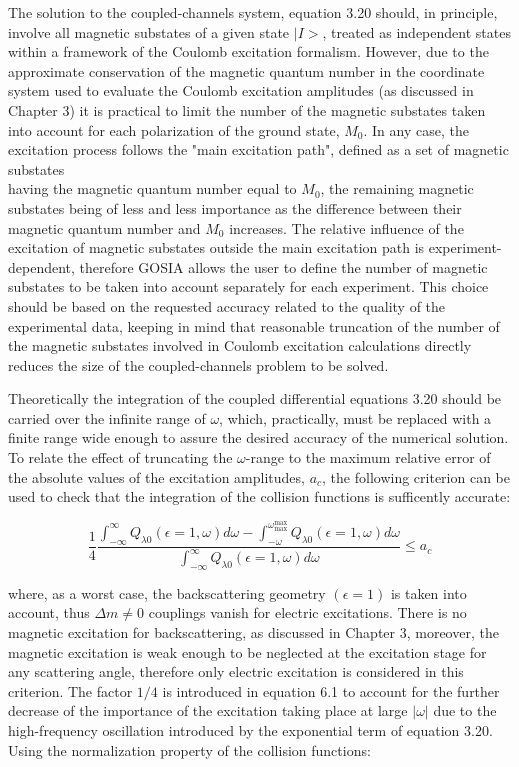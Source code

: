 \documentclass[10pt]{article}
\begin{document}
The solution to the coupled-channels system, equation 3.20 should, in principle, involve all magnetic substates of a given state $\mid I>$, treated as independent states within a framework of the Coulomb excitation formalism. However, due to the approximate conservation of the magnetic quantum number in the coordinate system used to evaluate the Coulomb excitation amplitudes (as discussed in Chapter 3) it is practical to limit the number of the magnetic substates taken into account for each polarization of the ground state, $M_{0}$. In any case, the excitation process follows the "main excitation path", defined as a set of magnetic substates\\
having the magnetic quantum number equal to $M_{0}$, the remaining magnetic substates being of less and less importance as the difference between their magnetic quantum number and $M_{0}$ increases. The relative influence of the excitation of magnetic substates outside the main excitation path is experiment-dependent, therefore GOSIA allows the user to define the number of magnetic substates to be taken into account separately for each experiment. This choice should be based on the requested accuracy related to the quality of the experimental data, keeping in mind that reasonable truncation of the number of the magnetic substates involved in Coulomb excitation calculations directly reduces the size of the coupled-channels problem to be solved.

Theoretically the integration of the coupled differential equations 3.20 should be carried over the infinite range of $\omega$, which, practically, must be replaced with a finite range wide enough to assure the desired accuracy of the numerical solution. To relate the effect of truncating the $\omega$-range to the maximum relative error of the absolute values of the excitation amplitudes, $a_{c}$, the following criterion can be used to check that the integration of the collision functions is sufficently accurate:


\begin{equation*}
\frac{1}{4} \frac{\int_{-\infty}^{\infty} Q_{\lambda 0}(\epsilon=1, \omega) d \omega-\int_{-\omega}^{\omega_{\max }^{\max }} Q_{\lambda 0}(\epsilon=1, \omega) d \omega}{\int_{-\infty}^{\infty} Q_{\lambda 0}(\epsilon=1, \omega) d \omega} \leq a_{c} \tag{6.1}
\end{equation*}


where, as a worst case, the backscattering geometry $(\epsilon=1)$ is taken into account, thus $\Delta m \neq 0$ couplings vanish for electric excitations. There is no magnetic excitation for backscattering, as discussed in Chapter 3, moreover, the magnetic excitation is weak enough to be neglected at the excitation stage for any scattering angle, therefore only electric excitation is considered in this criterion. The factor $1 / 4$ is introduced in equation 6.1 to account for the further decrease of the importance of the excitation taking place at large $|\omega|$ due to the high-frequency oscillation introduced by the exponential term of equation 3.20. Using the normalization property of the collision functions:
\end{document}
